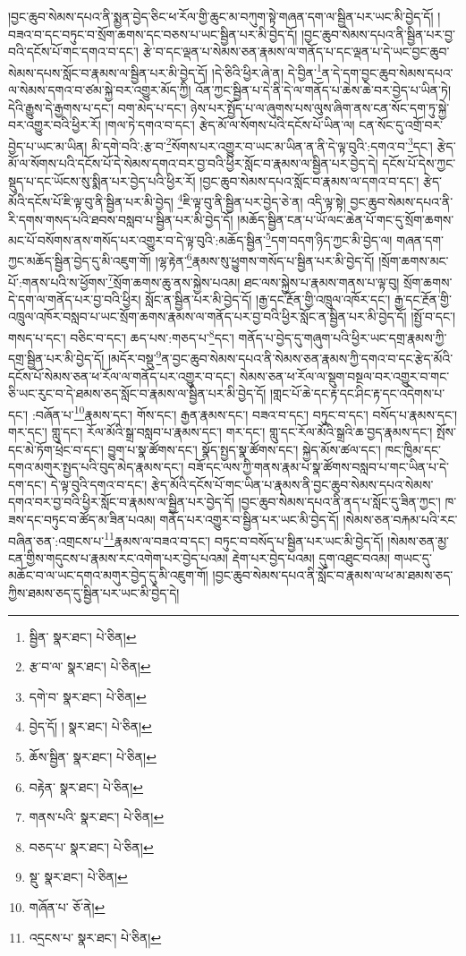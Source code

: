 །བྱང་ཆུབ་སེམས་དཔའ་ནི་སྨྱན་བྱེད་ཅིང་ཕ་རོལ་གྱི་ཆུང་མ་བཀུག་སྟེ་གཞན་དག་ལ་སྦྱིན་པར་ཡང་མི་བྱེད་དོ། །བཟའ་བ་དང་བཏུང་བ་སྲོག་ཆགས་དང་བཅས་པ་ཡང་སྦྱིན་པར་མི་བྱེད་དོ། །བྱང་ཆུབ་སེམས་དཔའ་ནི་སྦྱིན་པར་བྱ་བའི་དངོས་པོ་གང་དགའ་བ་དང་། རྩེ་བ་དང་ལྡན་པ་སེམས་ཅན་རྣམས་ལ་གནོད་པ་དང་ལྡན་པ་དེ་ཡང་བྱང་ཆུབ་སེམས་དཔས་སློང་བ་རྣམས་ལ་སྦྱིན་པར་མི་བྱེད་དོ། །དེ་ཅིའི་ཕྱིར་ཞེ་ན། དེ་བྱིན་\footnote{སྦྱིན་  སྣར་ཐང་།  པེ་ཅིན། }ན་དེ་དག་བྱང་ཆུབ་སེམས་དཔའ་ལ་སེམས་དགའ་བ་ཙམ་སྐྱེ་བར་འགྱུར་མོད་ཀྱི། འོན་ཀྱང་སྦྱིན་པ་དེ་ནི་དེ་ལ་གནོད་པ་ཆེས་ཆེ་བར་བྱེད་པ་ཡིན་ཏེ། དེའི་རྒྱུས་དེ་རྒྱགས་པ་དང་། བག་མེད་པ་དང་། ཉེས་པར་སྤྱོད་པ་ལ་ཞུགས་པས་ལུས་ཞིག་ནས་ངན་སོང་དག་ཏུ་སྐྱེ་བར་འགྱུར་བའི་ཕྱིར་རོ། །གལ་ཏེ་དགའ་བ་དང་། རྩེད་མོ་ལ་སོགས་པའི་དངོས་པོ་ཡིན་ལ། ངན་སོང་དུ་འགྲོ་བར་བྱེད་པ་ཡང་མ་ཡིན། མི་དགེ་བའི་:རྩ་བ་\footnote{རྩ་བ་ལ་  སྣར་ཐང་།  པེ་ཅིན། }སོགས་པར་འགྱུར་བ་ཡང་མ་ཡིན་ན་ནི་དེ་ལྟ་བུའི་:དགའ་བ་\footnote{དགེ་བ་  སྣར་ཐང་།  པེ་ཅིན། }དང་། རྩེད་མོ་ལ་སོགས་པའི་དངོས་པོ་དེ་སེམས་དགའ་བར་བྱ་བའི་ཕྱིར་སློང་བ་རྣམས་ལ་སྦྱིན་པར་བྱེད་དེ། དངོས་པོ་དེས་ཀྱང་སྡུད་པ་དང་ཡོངས་སུ་སྨིན་པར་བྱེད་པའི་ཕྱིར་རོ། །བྱང་ཆུབ་སེམས་དཔའ་སློང་བ་རྣམས་ལ་དགའ་བ་དང་། རྩེད་མོའི་དངོས་པོ་ཇི་ལྟ་བུ་ནི་སྦྱིན་པར་མི་བྱེད། \footnote{བྱེད་དོ། །   སྣར་ཐང་།  པེ་ཅིན། }ཇི་ལྟ་བུ་ནི་སྦྱིན་པར་བྱེད་ཅེ་ན། འདི་ལྟ་སྟེ། བྱང་ཆུབ་སེམས་དཔའ་ནི་རི་དགས་གསད་པའི་ཐབས་བསླབ་པ་སྦྱིན་པར་མི་བྱེད་དོ། །མཆོད་སྦྱིན་ངན་པ་ཡོ་ལང་ཆེན་པོ་གང་དུ་སྲོག་ཆགས་མང་པོ་བསོགས་ནས་གསོད་པར་འགྱུར་བ་དེ་ལྟ་བུའི་:མཆོད་སྦྱིན་\footnote{ཆོས་སྦྱིན་  སྣར་ཐང་།  པེ་ཅིན། }དག་བདག་ཉིད་ཀྱང་མི་བྱེད་ལ། གཞན་དག་ཀྱང་མཆོད་སྦྱིན་བྱེད་དུ་མི་འཇུག་གོ། །ལྷ་རྟེན་\footnote{བརྟེན་  སྣར་ཐང་།  པེ་ཅིན། }རྣམས་སུ་ཕྱུགས་གསོད་པ་སྦྱིན་པར་མི་བྱེད་དོ། །སྲོག་ཆགས་མང་པོ་:གནས་པའི་ས་ཕྱོགས་\footnote{གནས་པའི་  སྣར་ཐང་།  པེ་ཅིན། }སྲོག་ཆགས་ཆུ་ནས་སྐྱེས་པའམ། ཐང་ལས་སྐྱེས་པ་རྣམས་གནས་པ་ལྟ་བུ། སྲོག་ཆགས་དེ་དག་ལ་གནོད་པར་བྱ་བའི་ཕྱིར། སློང་ན་སྦྱིན་པར་མི་བྱེད་དོ། །རྒྱ་དང་རྔོན་གྱི་འཁྲུལ་འཁོར་དང་། རྒྱ་དང་རྔོན་གྱི་འཁྲུལ་འཁོར་བསླབ་པ་ཡང་སྲོག་ཆགས་རྣམས་ལ་གནོད་པར་བྱ་བའི་ཕྱིར་སློང་ན་སྦྱིན་པར་མི་བྱེད་དོ། །སྤྱོ་བ་དང་། གསད་པ་དང་། བཅིང་བ་དང་། ཆད་པས་:གཅད་པ་\footnote{བཅད་པ་  སྣར་ཐང་།  པེ་ཅིན། }དང་། གནོད་པ་བྱེད་དུ་གཞུག་པའི་ཕྱིར་ཡང་དགྲ་རྣམས་ཀྱི་དགྲ་སྦྱིན་པར་མི་བྱེད་དོ། །མདོར་བསྡུ་\footnote{སྡུ་  སྣར་ཐང་།  པེ་ཅིན། }ན་བྱང་ཆུབ་སེམས་དཔའ་ནི་སེམས་ཅན་རྣམས་ཀྱི་དགའ་བ་དང་རྩེད་མོའི་དངོས་པོ་སེམས་ཅན་ཕ་རོལ་ལ་གནོད་པར་འགྱུར་བ་དང་། སེམས་ཅན་ཕ་རོལ་ལ་སྡུག་བསྔལ་བར་འགྱུར་བ་གང་ཅི་ཡང་རུང་བ་དེ་ཐམས་ཅད་སློང་བ་རྣམས་ལ་སྦྱིན་པར་མི་བྱེད་དོ། །གླང་པོ་ཆེ་དང་རྟ་དང་ཤིང་རྟ་དང་འདེགས་པ་དང་། :བཞོན་པ་\footnote{གཞོན་པ་  ཅོ་ནེ། }རྣམས་དང་། གོས་དང་། རྒྱན་རྣམས་དང་། བཟའ་བ་དང་། བཏུང་བ་དང་། བསོད་པ་རྣམས་དང་། གར་དང་། གླུ་དང་། རོལ་མོའི་སྒྲ་བསླབ་པ་རྣམས་དང་། གར་དང་། གླུ་དང་རོལ་མོའི་སྒྲའི་ཆ་བྱད་རྣམས་དང་། སྤོས་དང་མེ་ཏོག་ཕྲེང་བ་དང་། བྱུག་པ་སྣ་ཚོགས་དང་། སྣོད་སྤྱད་སྣ་ཚོགས་དང་། སྐྱེད་མོས་ཚལ་དང་། ཁང་ཁྱིམ་དང་དགའ་མགུར་སྤྱད་པའི་བུད་མེད་རྣམས་དང་། བཟོ་དང་ལས་ཀྱི་གནས་རྣམ་པ་སྣ་ཚོགས་བསླབ་པ་གང་ཡིན་པ་དེ་དག་དང་། དེ་ལྟ་བུའི་དགའ་བ་དང་། རྩེད་མོའི་དངོས་པོ་གང་ཡིན་པ་རྣམས་ནི་བྱང་ཆུབ་སེམས་དཔའ་སེམས་དགའ་བར་བྱ་བའི་ཕྱིར་སློང་བ་རྣམས་ལ་སྦྱིན་པར་བྱེད་དོ། །བྱང་ཆུབ་སེམས་དཔའ་ནི་ནད་པ་སློང་དུ་ཟིན་ཀྱང་། ཁ་ཟས་དང་བཏུང་བ་ཚོད་མ་ཟིན་པའམ། གནོད་པར་འགྱུར་བ་སྦྱིན་པར་ཡང་མི་བྱེད་དོ། །སེམས་ཅན་བརྐམ་པའི་རང་བཞིན་ཅན་:འགྲངས་པ་\footnote{འདྲངས་པ་  སྣར་ཐང་།  པེ་ཅིན། }རྣམས་ལ་བཟའ་བ་དང་། བཏུང་བ་བསོད་པ་སྦྱིན་པར་ཡང་མི་བྱེད་དོ། །སེམས་ཅན་མྱ་ངན་གྱིས་གདུངས་པ་རྣམས་རང་འགེག་པར་བྱེད་པའམ། རྡེག་པར་བྱེད་པའམ། དུག་འཐུང་བའམ། གཡང་དུ་མཆོང་བ་ལ་ཡང་དགའ་མགུར་བྱེད་དུ་མི་འཇུག་གོ། །བྱང་ཆུབ་སེམས་དཔའ་ནི་སློང་བ་རྣམས་ལ་ཕ་མ་ཐམས་ཅད་ཀྱིས་ཐམས་ཅད་དུ་སྦྱིན་པར་ཡང་མི་བྱེད་དེ། 